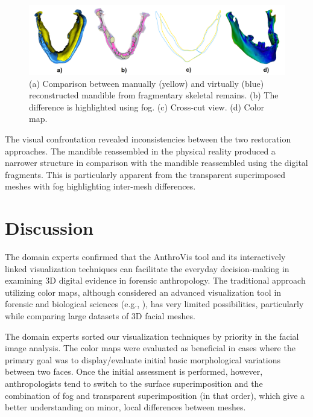 \documentclass[final,5p,times]{elsarticle}
\begin{document}
\begin{figure}[htb]
	\centering
  \includegraphics[width=0.9\linewidth]{pictures/case3.png}
  \caption{\label{fig:case3} (a) Comparison between manually (yellow) and virtually (blue) reconstructed mandible from fragmentary skeletal remains. (b) The difference is highlighted using fog. (c) Cross-cut view. (d) Color map.}
\end{figure}

The visual confrontation revealed inconsistencies between the two restoration approaches. 
The mandible reassembled in the physical reality produced a narrower structure in comparison with the mandible reassembled using the digital fragments. 
This is particularly apparent from the transparent superimposed meshes with fog highlighting inter-mesh differences. 
 
\section{Discussion} \label{discussion}
The domain experts confirmed that the AnthroVis tool and its interactively linked visualization techniques can facilitate the everyday decision-making in examining 3D digital evidence in forensic anthropology. 
The traditional approach utilizing color maps, although considered an advanced visualization tool in forensic and biological sciences (e.g., \cite{urbanova2015testing}), has very limited possibilities, particularly while comparing large datasets of 3D facial meshes.

The domain experts sorted our visualization techniques by priority in the facial image analysis. 
The color maps were evaluated as beneficial in cases where the primary goal was to display/evaluate initial basic morphological variations between two faces. 
Once the initial assessment is performed, however, anthropologists tend to switch to the surface superimposition and the combination of fog and transparent superimposition (in that order), which give a better understanding on minor, local differences between meshes. 
\end{document}
